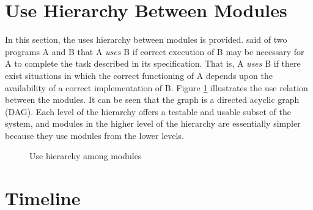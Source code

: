 \documentclass[12pt, titlepage]{article}
\begin{document}
\section{Use Hierarchy Between Modules} \label{SecUse}

In this section, the uses hierarchy between modules is
provided. \citet{Parnas1978} said of two programs A and B that A {\em uses} B if
correct execution of B may be necessary for A to complete the task described in
its specification. That is, A {\em uses} B if there exist situations in which
the correct functioning of A depends upon the availability of a correct
implementation of B.  Figure \ref{FigUH} illustrates the use relation between
the modules. It can be seen that the graph is a directed acyclic graph
(DAG). Each level of the hierarchy offers a testable and usable subset of the
system, and modules in the higher level of the hierarchy are essentially simpler
because they use modules from the lower levels.

\begin{figure}[H]
\centering
\caption{Use hierarchy among modules}
\label{FigUH}
\end{figure}

\section{Timeline}
\end{document}
